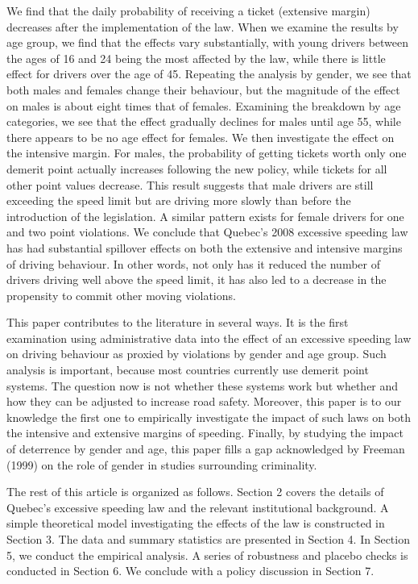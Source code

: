 We find that the daily probability of receiving a ticket (extensive margin) decreases after the implementation of the law. When we examine the results by age group, we find that the effects vary substantially, with young drivers between the ages of 16 and 24 being the most affected by the law, while there is little effect for drivers over the age of 45. Repeating the analysis by gender, we see that both males and females change their behaviour, but the magnitude of the effect on males is about eight times that of females. Examining the breakdown by age categories, we see that the effect gradually declines for males until age 55, while there appears to be no age effect for females. 
We then investigate the effect on the intensive margin. For males, the probability of getting tickets worth only one demerit point actually increases following the new policy, while tickets for all other point values decrease. This result suggests that male drivers are still exceeding the speed limit but are driving more slowly than before the introduction of the legislation. A similar pattern exists for female drivers for one and two point violations. We conclude that Quebec’s 2008 excessive speeding law has had substantial spillover effects on both the extensive and intensive margins of driving behaviour. In other words, not only has it reduced the number of drivers driving well above the speed limit, it has also led to a decrease in the propensity to commit other moving violations.

This paper contributes to the literature in several ways. It is the first examination using administrative data into the effect of an excessive speeding law on driving behaviour as proxied by violations by gender and age group. Such analysis is important, because most countries currently use demerit point systems. The question now is not whether these systems work but whether and how they can be adjusted to increase road safety. Moreover, this paper is to our knowledge the first one to empirically investigate the impact of such laws on both the intensive and extensive margins of speeding. Finally, by studying the impact of deterrence by gender and age, this paper fills a gap acknowledged by Freeman (1999) on the role of gender in studies surrounding criminality.

The rest of this article is organized as follows. Section 2 covers the details of Quebec’s excessive speeding law and the relevant institutional background. A simple theoretical model investigating the effects of the law is constructed in Section 3. The data and summary statistics are presented in Section 4. In Section 5, we conduct the empirical analysis. A series of robustness and placebo checks is conducted in Section 6. We conclude with a policy discussion in Section 7.
